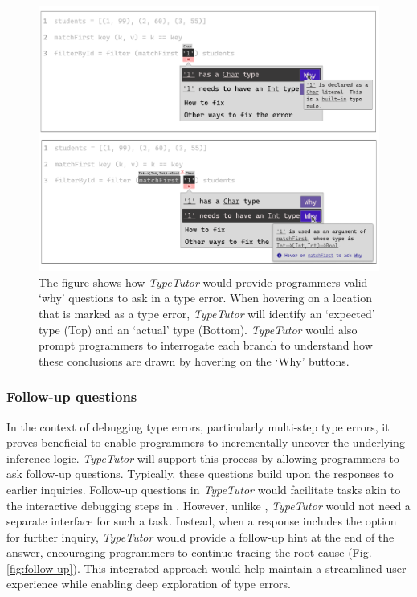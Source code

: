 \begin{figure}[hbt]
  \includegraphics[width=\linewidth]{Why}
  \caption[An example of \textit{TypeTutor} providing explanation (`why' questions)]{
      \label{fig:why}
      The figure shows how \textit{TypeTutor} would provide programmers valid `why' questions to ask in a type error. When hovering on a location that is marked as a type error, \textit{TypeTutor} will identify an `expected' type (Top) and an `actual' type (Bottom). \textit{TypeTutor} would also prompt programmers to interrogate each branch to understand how these conclusions are drawn by hovering on the `Why' buttons. 
    }
\end{figure}



\subsubsection{Follow-up questions}

In the context of debugging type errors, particularly multi-step type errors, it proves beneficial to enable programmers to incrementally uncover the underlying inference logic. \textit{TypeTutor} will support this process by allowing programmers to ask follow-up questions. Typically, these questions build upon the responses to earlier inquiries. Follow-up questions in \textit{TypeTutor} would facilitate tasks akin to the interactive debugging steps in \chameleon{}. However, unlike \chameleon{}, \textit{TypeTutor} would not need a separate interface for such a task. Instead, when a response includes the option for further inquiry, \textit{TypeTutor} would provide a follow-up hint at the end of the answer, encouraging programmers to continue tracing the root cause (Fig. \ref{fig:follow-up}). This integrated approach would help maintain a streamlined user experience while enabling deep exploration of type errors.


